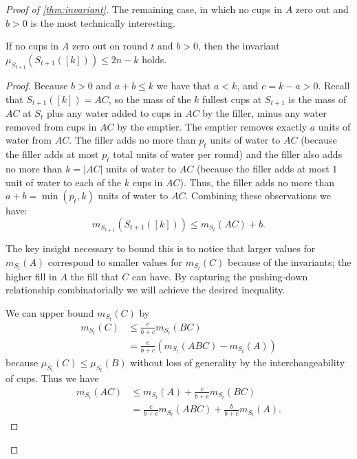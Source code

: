\begin{proof}[Proof of \cref{thm:invariant}]
The remaining case, in which no cups in $A$ zero out and $b > 0$ is the most technically interesting.
\begin{clm}
  If no cups in $A$ zero out on round $t$ and $b > 0$, then the invariant
  $\mu_{S_{t+1}}(S_{t+1}([k])) \le 2n-k$ holds.
\end{clm}
\begin{proof}
Because $b>0$ and $a+b \le k$ we have that $a
< k$, and $c = k-a > 0$. Recall that $S_{t+1}([k]) = AC$, so the mass of the
$k$ fullest cups at $S_{t+1}$ is the mass of $AC$ at $S_t$ plus any water added
to cups in $AC$ by the filler, minus any water removed from cups in $AC$ by the
emptier. The emptier removes exactly $a$ units of water from $AC$.
The filler adds no more than $p_t$ units of water to $AC$ (because the filler
adds at most $p_t$ total units of water per round) and the filler also
adds no more than $k = |AC|$ units of water to $AC$ (because the filler adds
at most $1$ unit of water to each of the $k$ cups in $AC$).
Thus, the filler adds no more than $a+b = \min(p_t, k)$ units of water to $AC$.
Combining these observations we have:
\begin{equation}
m_{S_{t+1}}(S_{t+1}([k])) \le m_{S_t}(AC) + b.
\label{eq:emptiereptiessomestufffillerfillssomestuff}
\end{equation}

The key insight necessary to bound this is to notice that larger values for
$m_{S_t}(A)$ correspond to smaller values for $m_{S_t}(C)$ because of the
invariants; the higher fill in $A$  the fill that $C$ can
have. By capturing the pushing-down relationship combinatorially we will achieve the desired inequality.

We can upper bound $m_{S_t}(C)$ by 
\begin{align*}
m_{S_t}(C) & \le \frac{c}{b+c}m_{S_t}(BC) \\
&= \frac{c}{b+c}(m_{S_t}(ABC) - m_{S_t}(A))
\end{align*}
 because
$\mu_{S_t}(C) \le \mu_{S_t}(B)$ without loss of generality by the
interchangeability of cups.
Thus we have 
\begin{align}
  m_{S_t}(AC) &\le m_{S_t}(A) + \frac{c}{b+c}m_{S_t}(BC)\label{eqn:BCdiscounted}\\
  &= \frac{c}{b+c}m_{S_t}(ABC) + \frac{b}{b+c}m_{S_t}(A)\label{eqn:redistributeA}.
\end{align}


\end{proof}
\end{proof}
